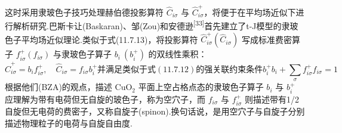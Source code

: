 这时采用隶玻色子技巧处理赫伯德投影算符 $\hat{C}_{i\sigma}$ 与 $\hat{C}_{i\sigma}^{+}$，将便于在平均场近似下进行解析研究.巴斯卡让(Baskaran)、邹(Zou)和安德逊\textsuperscript{[33]}首先建立了t-J模型的隶玻色子平均场近似理论.类似于式(11.7.13)，将投影算符 $\hat{C}_{i\sigma}^{+}(\hat{C}_{i\sigma})$ 写成标准费密算子 $f_{i\sigma}^{+}(f_{i\sigma})$ 与隶玻色子算子 $b_{i}\ (b_{i}^{+})$ 的双线性乘积：
\begin{subequations}
\begin{equation}
  \hat{C}_{i\sigma}^{+}=b_{i}f_{i\sigma}^{+},\quad \hat{C}_{i\sigma}=f_{i\sigma}b_{i}^{+}
\end{equation}
并满足类似于式(11.7.12)的强关联约束条件
\begin{equation}
  b_{i}^{+}b_{i}+\sum_{\sigma}f_{i\sigma}^{+}f_{i\sigma}=1
\end{equation}
\end{subequations}
根据他们(BZA)的观点，描述 $\mathrm{CuO_{2}}$ 平面上空占格点态的隶玻色子算子 $b_{i}$ 与 $b_{i}^{+}$ 应理解为带有电荷但无自旋的玻色子，称为空穴子，而 $f_{i\sigma}$ 与 $f_{i\sigma}^{+}$ 则描述带有1/2自旋但无电荷的费密子，又称自旋子(spinon).换句话说，是用空穴子与自旋子分别描述物理粒子的电荷与自旋自由度.

